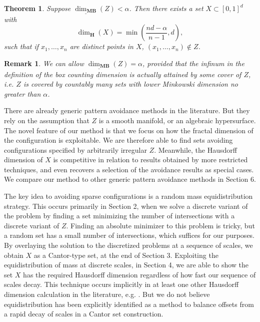 \documentclass[usenames,dvipsnames]{article}
\theoremstyle{plain}
\theoremstyle{plain}
\newtheorem{theorem}{Theorem}
\newtheorem*{remark}{Remark}
\begin{document}
\begin{theorem}
	Suppose $\underline{\dim_{\mathbf{MB}}}(Z) < \alpha$. Then there exists a set $X \subset [0,1]^d$ with
	\[ \dim_{\mathbf{H}}(X) = \min \left( \frac{nd - \alpha}{n-1}, d \right), \]
	such that if $x_1, \dots, x_n$ are distinct points in $X$, $(x_1, \dots, x_n) \not \in Z$.
\end{theorem}

\begin{remark}
	We can allow $\underline{\dim_{\mathbf{MB}}}(Z) = \alpha$, provided that the infinum in the definition of the box counting dimension is actually attained by some cover of $Z$, i.e. $Z$ is covered by countably many sets with lower Minkowski dimension no greater than $\alpha$.
\end{remark}

There are already generic pattern avoidance methods in the literature. But they rely on the assumption that $Z$ is a smooth manifold, or an algebraic hypersurface. The novel feature of our method is that we focus on how the fractal dimension of the configuration is exploitable. We are therefore able to find sets avoiding configurations specified by arbitrarily irregular $Z$. Meanwhile, the Hausdorff dimension of $X$ is competitive in relation to results obtained by more restricted techniques, and even recovers a selection of the avoidance results as special cases. We compare our method to other generic pattern avoidance methods in Section 6.

The key idea to avoiding sparse configurations is a random mass equidistribution strategy. This occurs primarily in Section 2, when we solve a discrete variant of the problem by finding a set minimizing the number of intersections with a discrete variant of $Z$. Finding an absolute minimizer to this problem is tricky, but a random set has a small number of intersections, which suffices for our purposes. By overlaying the solution to the discretized problems at a sequence of scales, we obtain $X$ as a Cantor-type set, at the end of Section 3. Exploiting the equidistribution of mass at discrete scales, in Section 4, we are able to show the set $X$ has the required Hausdorff dimension regardless of how fast our sequence of scales decay. This technique occurs implicitly in at least one other Hausdorff dimension calculation in the literature, e.g. \cite{MalabikaRob}. But we do not believe equidistribution has been explicitly identified as a method to balance offsets from a rapid decay of scales in a Cantor set construction.
\end{document}
